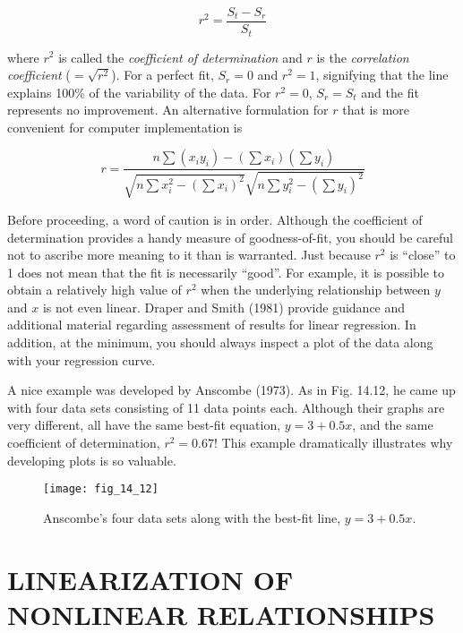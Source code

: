 \documentclass[../main.tex]{subfiles}
\begin{document}
\begin{equation}
	\tag{14.20}
	r^2 = \frac{S_t - S_r}{S_t}
\end{equation}

\noindent where $r^2$ is called the \textit{coefficient of determination} and $r$ is the \textit{correlation coefficient} ($=\sqrt{r^2}$). For a perfect fit, $S_r = 0$ and $r^2 = 1$, signifying that the line explains 100\% of the variability of the data. For $r^2 = 0$, $S_r = S_t$ and the fit represents no improvement. An alternative formulation for $r$ that is more convenient for computer implementation is

\begin{equation}
	\tag{14.21}
	r = \frac{n \sum (x_i y_i) - (\sum x_i) (\sum y_i)}{\sqrt{n \sum x^2_i - (\sum x_i)^2} \sqrt{n \sum y^2_i - (\sum y_i)^2}}
\end{equation}


Before proceeding, a word of caution is in order. Although the coefficient of determination provides a handy measure of goodness-of-fit, you should be careful not to ascribe more meaning to it than is warranted. Just because $r^2$ is ``close'' to 1 does not mean that the fit is necessarily ``good''. For example, it is possible to obtain a relatively high value of $r^2$ when the underlying relationship between $y$ and $x$ is not even linear. Draper and Smith (1981) provide guidance and additional material regarding assessment of results for linear regression. In addition, at the minimum, you should always inspect a plot of the data along with your regression curve.

A nice example was developed by Anscombe (1973). As in Fig. 14.12, he came up with four data sets consisting of 11 data points each. Although their graphs are very different, all have the same best-fit equation, $y = 3 + 0.5 x$, and the same coefficient of determination, $r^2 = 0.67$! This example dramatically illustrates why developing plots is so valuable.

\begin{figure}[H]
	\centering
	\texttt{[image: fig\_14\_12]}
	\caption{\textsf{Anscombe's four data sets along with the best-fit line, $y = 3 + 0.5x$.}}
	\label{fig:fig_14_12}
\end{figure}


\label{cha:cha_P_14_4}
\section{LINEARIZATION OF NONLINEAR RELATIONSHIPS}
\end{document}
